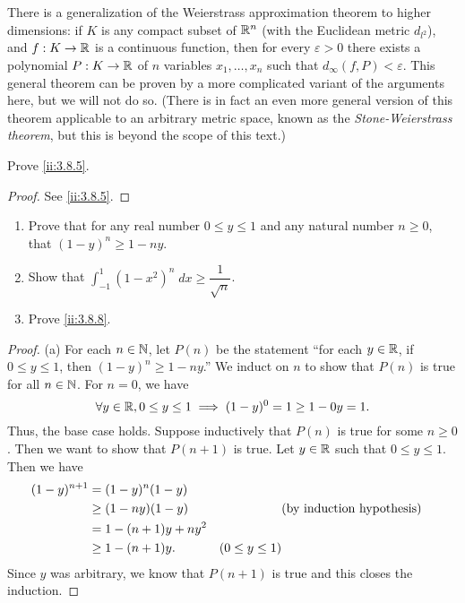 \begin{rmk}\label{ii:3.8.21}
  There is a generalization of the Weierstrass approximation theorem to higher dimensions:
  if \(K\) is any compact subset of \(\mathbb{R}^n\) (with the Euclidean metric \(d_{l^2}\)), and \(f : K \to \mathbb{R}\) is a continuous function, then for every \(\varepsilon > 0\) there exists a polynomial \(P : K \to \mathbb{R}\) of \(n\) variables \(x_1, \dots, x_n\) such that \(d_\infty(f, P) < \varepsilon\).
  This general theorem can be proven by a more complicated variant of the arguments here, but we will not do so.
  (There is in fact an even more general version of this theorem applicable to an arbitrary metric space, known as the \emph{Stone-Weierstrass theorem}, but this is beyond the scope of this text.)
\end{rmk}

\exercisesection

\begin{ex}\label{ii:ex:3.8.1}
  Prove \cref{ii:3.8.5}.
\end{ex}

\begin{proof}
  See \cref{ii:3.8.5}.
\end{proof}

\begin{ex}\label{ii:ex:3.8.2}
  \quad
  \begin{enumerate}
    \item Prove that for any real number \(0 \leq y \leq 1\) and any natural number \(n \geq 0\), that \((1 - y)^n \geq 1 - ny\).
    \item Show that \(\int_{-1}^1 (1 - x^2)^n \; dx \geq \dfrac{1}{\sqrt{n}}\).
    \item Prove \cref{ii:3.8.8}.
  \end{enumerate}
\end{ex}

\begin{proof}{(a)}
  For each \(n \in \mathbb{N}\), let \(P(n)\) be the statement ``for each \(y \in \mathbb{R}\), if \(0 \leq y \leq 1\), then \((1 - y)^n \geq 1 - ny\).''
  We induct on \(n\) to show that \(P(n)\) is true for all \(n \in \mathbb{N}\).
  For \(n = 0\), we have
  \[
    \forall y \in \mathbb{R}, 0 \leq y \leq 1 \implies (1 - y)^0 = 1 \geq 1 - 0y = 1.
  \]
  Thus, the base case holds.
  Suppose inductively that \(P(n)\) is true for some \(n \geq 0\).
  Then we want to show that \(P(n + 1)\) is true.
  Let \(y \in \mathbb{R}\) such that \(0 \leq y \leq 1\).
  Then we have
  \begin{align*}
    (1 - y)^{n + 1} & = (1 - y)^n (1 - y)                                \\
                    & \geq (1 - ny) (1 - y)  &                   & \text{(by induction hypothesis)} \\
                    & = 1 - (n + 1)y + n y^2                             \\
                    & \geq 1 - (n + 1)y.     & (0 \leq y \leq 1)
  \end{align*}
  Since \(y\) was arbitrary, we know that \(P(n + 1)\) is true and this closes the induction.
\end{proof}

